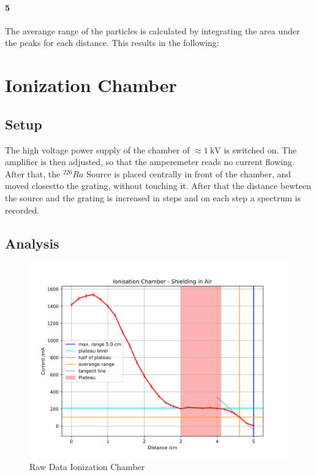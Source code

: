 \documentclass[12pt,twoside,a4paper]{scrartcl}
\begin{document}
			\paragraph{5}
				The averange range of the particles is calculated by integrating the area under the peaks for each distance.
				This results in the following:

\section{Ionization Chamber}

	\subsection{Setup}
		 The high voltage power supply of the chamber of $\approx \SI{1}{\kilo \volt}$ is switched on. The amplifier is then adjusted, so that the amperemeter reads no current flowing. After that, the $^{226}Ra$ Source is placed centrally in front of the chamber, and moved closestto the grating, without touching it. After that the distance bewteen the source and the grating is increased in steps and on each step a spectrum is recorded.

	\subsection{Analysis}

		\begin{figure}[H]
			\includegraphics{Plots/ionisation_chamber/CurrentToDistance.png}
			\caption{Raw Data Ionization Chamber}
		\end{figure}
\end{document}
